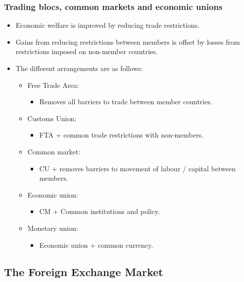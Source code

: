 \documentclass[../notes_compiled.tex]{subfiles}
\begin{document}
\subsubsection{Trading blocs, common markets and economic unions}
\begin{itemize}
\item Economic welfare is improved by reducing trade restrictions.
\item Gains from reducing restrictions between members is offset by losses from restrictions imposed on non-member countries.
\item The different arrangements are as follows:
\begin{itemize}
\item Free Trade Area:
\begin{itemize}
\item Removes all barriers to trade between member countries.
\end{itemize}
\item Customs Union:
\begin{itemize}
\item FTA + common trade restrictions with non-members.
\end{itemize}
\item Common market:
\begin{itemize}
\item CU + removes barriers to movement of labour / capital between members.
\end{itemize}
\item Economic union:
\begin{itemize}
\item CM + Common institutions and policy.
\end{itemize}
\item Monetary union:
\begin{itemize}
\item Economic union + common currency.
\end{itemize}
\end{itemize}
\end{itemize}

\subsection{The Foreign Exchange Market}
\end{document}

